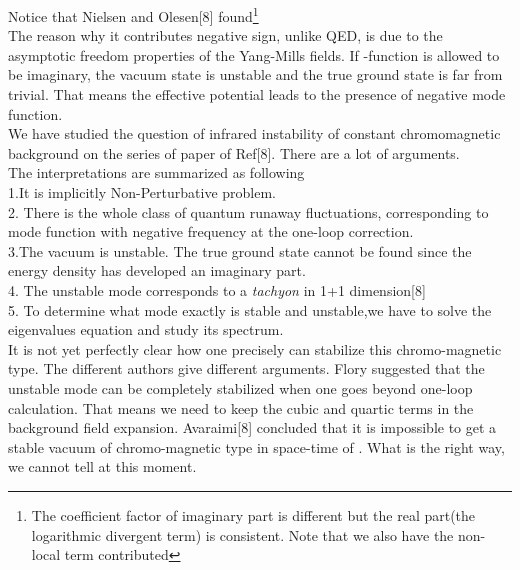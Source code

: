 \documentclass[a4paper,12 pt]{article}
\begin{document}
\begin{center}
\coordHE{}
\end{center}
Notice that Nielsen and Olesen[8] found\footnote{The coefficient
factor of imaginary part is different but the real
 part(the logarithmic divergent term) is consistent.
  Note that we also have the non-local term contributed} \coordHE{}\\
The reason why it contributes negative sign, unlike QED, is due to
the asymptotic freedom properties of the
 Yang-Mills fields.
 If \coordHE{}
-function is allowed to be imaginary, the vacuum state is unstable
and the true ground state is far from trivial. That means the
effective potential leads to the presence of negative mode
function.
\\We have studied the question of infrared instability of constant
chromomagnetic background on the series of paper of Ref[8]. There
are a lot of arguments.\\
The interpretations are summarized as following\\
1.It is implicitly Non-Perturbative problem. \\ 2. There is the
whole class of quantum runaway fluctuations, corresponding to mode
function with negative frequency at the
one-loop correction.\\
3.The vacuum is unstable. The true ground state cannot be found since the energy
density has developed an imaginary part.\\
4. The unstable mode corresponds to a \emph{tachyon} in 1+1 dimension[8]\\
5. To determine what mode exactly is stable and unstable,we have
to solve the eigenvalues equation and study its spectrum. \\
It is not yet perfectly clear how one precisely can stabilize this
chromo-magnetic type. The different authors give different
arguments. Flory suggested that the unstable mode can be
completely stabilized when one goes beyond one-loop calculation.
That means we need to keep the cubic and quartic terms in the
background field expansion. Avaraimi[8] concluded that it is
impossible to get a stable vacuum of chromo-magnetic type in
space-time of \coordHE{}. What is the right way, we cannot tell at
this moment.
\end{document}
